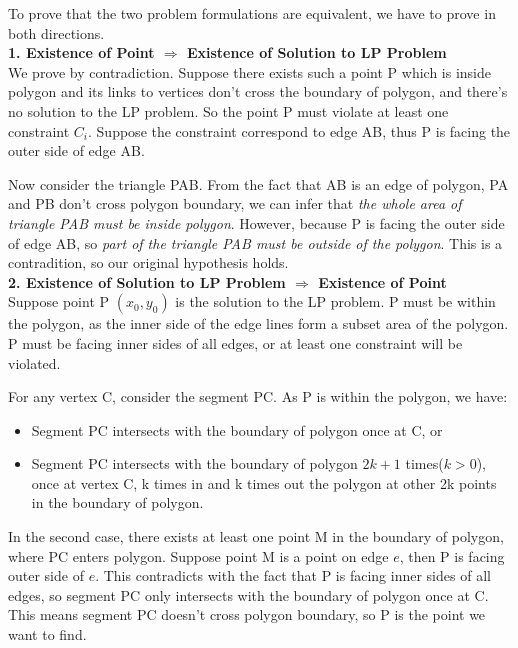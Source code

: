 To prove that the two problem formulations are equivalent, we have to prove in both directions.\\

\textbf{1. Existence of Point $\Rightarrow$ Existence of Solution to LP Problem }\\

We prove by contradiction. Suppose there exists such a point P which is inside polygon and its links to vertices don't cross the boundary of polygon, and there's no solution to the LP problem. So the point P must violate at least one constraint $C_i$. Suppose the constraint correspond to edge AB, thus P is facing the outer side of edge AB.

Now consider the triangle PAB. From the fact that AB is an edge of polygon, PA and PB don't cross polygon boundary, we can infer that \textit{the whole area of triangle PAB must be inside polygon}. However, because P is facing the outer side of edge AB, so \textit{part of the triangle PAB must be outside of the polygon}. This is a contradition, so our original hypothesis holds. \\

\textbf{2. Existence of Solution to LP Problem $\Rightarrow$ Existence of Point }\\

Suppose point P $(x_0, y_0)$ is the solution to the LP problem. P must be within the polygon, as the inner side of the edge lines form a subset area of the polygon. P must be facing inner sides of all edges, or at least one constraint will be violated.

For any vertex C, consider the segment PC. As P is within the polygon, we have:

\begin{itemize}
\item Segment PC intersects with the boundary of polygon once at C, or
\item Segment PC intersects with the boundary of polygon $2k + 1$ times($k > 0$), once at vertex C, k times in and k times out the polygon at other 2k points in the boundary of polygon.
\end{itemize}

In the second case, there exists at least one point M in the boundary of polygon, where PC enters polygon. Suppose point M is a point on edge $e$, then P is facing outer side of $e$. This contradicts with the fact that P is facing inner sides of all edges, so segment PC only intersects with the boundary of polygon once at C. This means segment PC doesn't cross polygon boundary, so P is the point we want to find.
